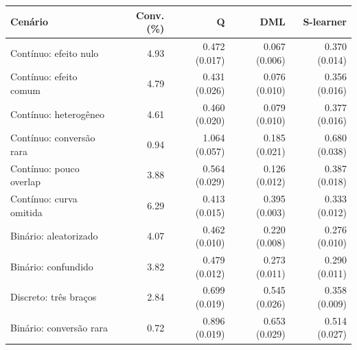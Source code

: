 \begin{tabular}{lrrrr}
\toprule
Cenário & Conv. (\%) & Q & DML & S-learner \\
\midrule
Contínuo: efeito nulo & 4.93 & 0.472 (0.017) & 0.067 (0.006) & 0.370 (0.014) \\
Contínuo: efeito comum & 4.79 & 0.431 (0.026) & 0.076 (0.010) & 0.356 (0.016) \\
Contínuo: heterogêneo & 4.61 & 0.460 (0.020) & 0.079 (0.010) & 0.377 (0.016) \\
Contínuo: conversão rara & 0.94 & 1.064 (0.057) & 0.185 (0.021) & 0.680 (0.038) \\
Contínuo: pouco overlap & 3.88 & 0.564 (0.029) & 0.126 (0.012) & 0.387 (0.018) \\
Contínuo: curva omitida & 6.29 & 0.413 (0.015) & 0.395 (0.003) & 0.333 (0.012) \\
Binário: aleatorizado & 4.07 & 0.462 (0.010) & 0.220 (0.008) & 0.276 (0.010) \\
Binário: confundido & 3.82 & 0.479 (0.012) & 0.273 (0.011) & 0.290 (0.011) \\
Discreto: três braços & 2.84 & 0.699 (0.019) & 0.545 (0.026) & 0.358 (0.009) \\
Binário: conversão rara & 0.72 & 0.896 (0.019) & 0.653 (0.029) & 0.514 (0.027) \\
\bottomrule
\end{tabular}
